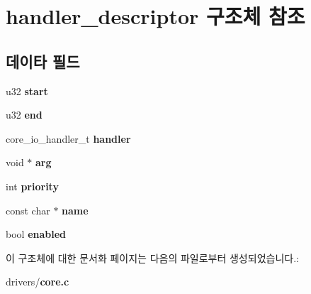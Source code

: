 \section{handler\-\_\-descriptor 구조체 참조}
\label{structhandler__descriptor}
\subsection*{데이타 필드}
\begin{DoxyCompactItemize}
\item 
u32 {\bfseries start}\label{structhandler__descriptor_ac7a8660ed3c09868d81b59aa7b6b6257}

\item 
u32 {\bfseries end}\label{structhandler__descriptor_a57bc465572bff67775d9685856ffecd2}

\item 
core\-\_\-io\-\_\-handler\-\_\-t {\bfseries handler}\label{structhandler__descriptor_a4a5c08809144b9722ef3e6cd594d53d4}

\item 
void $\ast$ {\bfseries arg}\label{structhandler__descriptor_a7947460765d3a5f4a8443589757412ae}

\item 
int {\bfseries priority}\label{structhandler__descriptor_a6982eaff7320df6e530b103205ceafb5}

\item 
const char $\ast$ {\bfseries name}\label{structhandler__descriptor_a6a25d4f6106240fa220e770336a632b4}

\item 
bool {\bfseries enabled}\label{structhandler__descriptor_ab0388fbbbb9dc66d2b2a88e6f1d80404}

\end{DoxyCompactItemize}


이 구조체에 대한 문서화 페이지는 다음의 파일로부터 생성되었습니다.\-:\begin{DoxyCompactItemize}
\item 
drivers/{\bf core.\-c}\end{DoxyCompactItemize}
